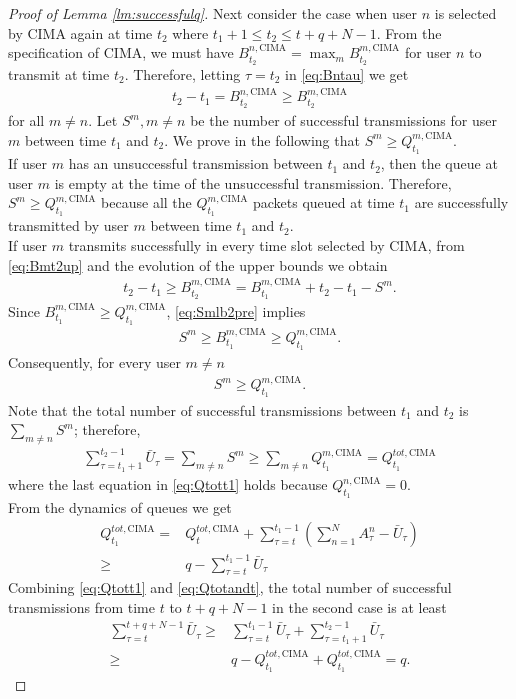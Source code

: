 \documentclass[onecolumn,draftcls]{IEEEtran}
\newcommand{\g}{\text{CIMA}}
\begin{document}
\begin{proof}[Proof of Lemma \ref{lm:successfulq}]
Next consider the case when user $n$ is selected by $\g$ again at time $t_2$ where $t_1+1\leq t_2\leq t+q+N-1$.
From the specification of $\g$, we must have $B^{n,\g}_{t_2} = \max_{m} B^{m,\g}_{t_2}$ for user $n$ to transmit at time $t_2$.
Therefore, letting $\tau = t_2$ in \eqref{eq:Bntau} we get
\begin{align}
t_2-t_1 = B^{n,\g}_{t_2} \geq B^{m,\g}_{t_2}
 \label{eq:Bmt2up}
\end{align}
for all $m \neq n$.
Let $S^m, m\neq n$ be the number of successful transmissions for user $m$ between time $t_1$ and $t_2$.
We prove in the following that $S^m \geq Q^{m,\g}_{t_1}$.
\\
If user $m$ has an unsuccessful transmission between $t_1$ and $t_2$, then the queue at user $m$ is empty at the time of the unsuccessful transmission. Therefore,
$S^m \geq Q^{m,\g}_{t_1}$ because all the $Q^{m,\g}_{t_1}$ packets queued at time $t_1$ are successfully transmitted by user $m$ between time $t_1$ and $t_2$. 
\\
If user $m$ transmits successfully in every time slot selected by $\g$, from \eqref{eq:Bmt2up} and the evolution of the upper bounds we obtain
\begin{align}
t_2-t_1 \geq B^{m,\g}_{t_2} = B^{m,\g}_{t_1}+t_2-t_1-S^m.
\label{eq:Smlb2pre}
\end{align}
Since $B^{m,\g}_{t_1} \geq Q^{m,\g}_{t_1}$, \eqref{eq:Smlb2pre} implies
\begin{align}
S^m \geq B^{m,\g}_{t_1} \geq Q^{m,\g}_{t_1}.
\label{eq:Smlb2}
\end{align}
Consequently, for every user $m\neq n$
\begin{align}
S^m \geq Q^{m,\g}_{t_1}.
\end{align}
Note that the total number of successful transmissions between $t_1$ and $t_2$ is $\sum_{m\neq n}S^m $; therefore,
\begin{align}
\sum_{\tau=t_1+1}^{t_2-1} \bar{U}_{\tau} = \sum_{m\neq n}S^m \geq \sum_{m\neq n}Q^{m,\g}_{t_1} = Q^{tot,\g}_{t_1}
\label{eq:Qtott1}
\end{align}
where the last equation in \eqref{eq:Qtott1} holds because $Q^{n,\g}_{t_1}=0$.
\\
From the dynamics of queues we get
\begin{align}
Q^{tot,\g}_{t_1} = & Q^{tot,\g}_{t}+ \sum_{\tau=t}^{t_1-1} \left( \sum_{n=1}^N A^n_{\tau}-\bar{U}_{\tau}\right) \nonumber\\
			     \geq & q- \sum_{\tau=t}^{t_1-1}\bar{U}_{\tau} 
\label{eq:Qtotandt}
\end{align}
Combining \eqref{eq:Qtott1} and \eqref{eq:Qtotandt}, the total number of successful transmissions from time $t$ to $t+q+N-1$ in the second case is at least
\begin{align}
\sum_{\tau=t}^{t+q+N-1} \bar{U}_{\tau}
\geq & \sum_{\tau=t}^{t_1-1} \bar{U}_{\tau}+\sum_{\tau=t_1+1}^{t_2-1} \bar{U}_{\tau} \nonumber\\
\geq & q - Q^{tot,\g}_{t_1} + Q^{tot,\g}_{t_1}  = q.
\end{align}



\end{proof}
\end{document}
